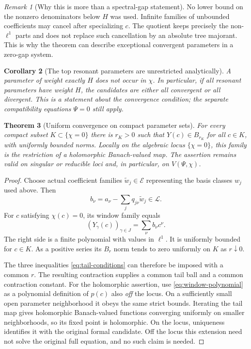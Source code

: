 \documentclass[11pt,a4paper]{article}
\numberwithin{equation}{section}
\newtheorem{theorem}{Theorem}[section]
\newtheorem{corollary}[theorem]{Corollary}
\theoremstyle{definition}
\theoremstyle{remark}
\newtheorem{remark}[theorem]{Remark}
\begin{document}
\begin{remark}[Why this is more than a spectral-gap statement]
No lower bound on the nonzero denominators below $H$ was used. Infinite
families of unbounded coefficients may cancel after specializing $c$.
The quotient keeps precisely the non-$\ell^1$ parts and does not replace
such cancellation by an absolute tree majorant. This is why the theorem
can describe exceptional convergent parameters in a zero-gap system.
\end{remark}

\begin{corollary}[The top resonant parameters are unrestricted analytically]
A parameter of weight exactly $H$ does not occur in $\chi$. In particular,
if all resonant parameters have weight $H$, the candidates are either all
convergent or all divergent. This is a statement about the convergence
condition; the separate compatibility equations $\Psi=0$ still apply.
\end{corollary}

\begin{theorem}[Uniform convergence on compact parameter sets]
\label{thm:uniform}
For every compact subset $K\subset\{\chi=0\}$ there is $r_K>0$ such that
$Y(c)\in B_{r_K}$ for all $c\in K$, with uniformly bounded norms.
Locally on the algebraic locus $\{\chi=0\}$, this family is the restriction
of a holomorphic Banach-valued map. The assertion remains valid on singular
or reducible loci and, in particular, on $V(\Psi,\chi)$.
\end{theorem}
\begin{proof}
Choose actual coefficient families $\widetilde w_j\in\mathcal E$
representing the basis classes $w_j$ used above. Then
\[
 b_\nu=a_\nu-\sum_jq_{j\nu}\widetilde w_j\in\mathcal L.
\]
For $c$ satisfying $\chi(c)=0$, its window family equals
\begin{equation}\label{eq:window-polynomial}
 (Y_\gamma(c))_{\gamma\in J}=\sum_\nu b_\nu c^\nu.
\end{equation}
The right side is a finite polynomial with values in $\ell^1$.
It is uniformly bounded for $c\in K$. As a positive series its $B_r$ norm
tends to zero uniformly on $K$ as $r\downarrow0$.

The three inequalities \eqref{eq:tail-conditions} can therefore be imposed
with a common $r$. The resulting contraction supplies a common tail ball
and a common contraction constant. For the holomorphic assertion, use
\eqref{eq:window-polynomial} as a polynomial definition of $p(c)$ also
\emph{off} the locus. On a sufficiently small open parameter neighborhood
it obeys the same strict bounds. Iterating the tail map gives holomorphic
Banach-valued functions converging uniformly on smaller neighborhoods,
so its fixed point is holomorphic. On the locus, uniqueness identifies it
with the original formal candidate. Off the locus this extension need not
solve the original full equation, and no such claim is needed.
\end{proof}
\end{document}
